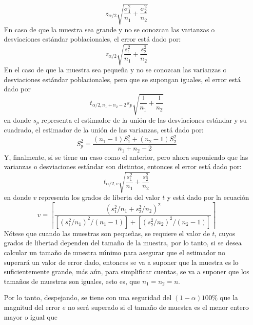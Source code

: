 \begin{solucion}
 \begin{equation*}
  z_{\alpha/2}\sqrt{ \frac{\sigma_1^2}{n_1} + \frac{\sigma_2^2}{n_2}}
 \end{equation*}
 En caso de que la muestra sea grande y no se conozcan las varianzas o desviaciones est\'andar poblacionales, el error est\'a dado por:
 \begin{equation*}
  z_{\alpha/2}\sqrt{\frac{s_1^2}{n_1} + \frac{s_2^2}{n_2}}
 \end{equation*}
 En el caso de que la muestra sea peque\~na y no se conozcan las varianzas o desviaciones est\'andar poblacionales, pero que se supongan iguales, el error est\'a dado por
 \begin{equation*}
  t_{\alpha/2,n_1+n_2-2}s_p\sqrt{\frac{1}{n_1} + \frac{1}{n_2}}
 \end{equation*}
 en donde $s_p$ representa el estimador de la uni\'on de las desviaciones est\'andar y su cuadrado, el estimador de la uni\'on de las varianzas, est\'a dado por:
 \begin{equation*}
  S_p^2 = \frac{\left( n_1 - 1 \right)S_1^2 + \left( n_2 - 1 \right)S_2^2}{n_1 + n_2 - 2}
 \end{equation*}
 Y, finalmente, si se tiene un caso como el anterior, pero ahora suponiendo que las varianzas o desviaciones est\'andar son distintos, entonces el error est\'a dado por:
 \begin{equation*}
  t_{\alpha/2,v}\sqrt{\frac{s_1^2}{n_1} + \frac{s_2^2}{n_2}}
 \end{equation*}
 en donde $v$ representa los grados de liberta del valor $t$ y est\'a dado por la ecuaci\'on
 \begin{equation*}
  v = \left\lceil \frac{\left(s_1^2/n_1 + s_2^2/n_2\right)^2}{\left[ \left( s_1^2/n_1 \right)^2/\left( n_1 - 1 \right) \right] + \left[ \left( s_2^2/n_2 \right)^2/\left( n_2 - 1 \right) \right]} \right\rceil
 \end{equation*}
 N\'otese que cuando las muestras son peque\~nas, se requiere el valor de $t$, cuyos grados de libertad dependen del tama\~no de la muestra, por lo tanto, si se desea calcular un tama\~no de muestra m\'{\i}nimo para asegurar que el estimador no superar\'a un valor de error dado, entonces se va a suponer que la muestra es lo suficientemente grande, m\'as a\'un, para simplificar cuentas, se va a suponer que los tama\~nos de muestras son iguales, esto es, que $n_1 = n_2 = n$.
 \par 
 Por lo tanto, despejando, se tiene con una seguridad del $(1-\alpha)100\%$ que la magnitud del error $e$ no ser\'a superado si el tama\~no de muestra es el menor entero mayor o igual que

\end{solucion}
